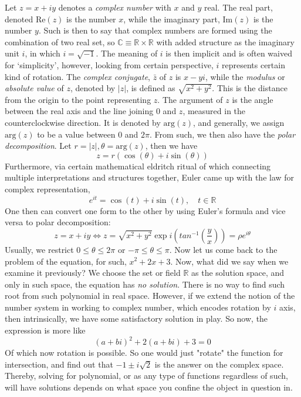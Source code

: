 Let $z=x+iy$ denotes a \textit{complex number} with $x$ and $y$ real. The real part, denoted $\mathrm{Re}{(z)}$ is the number $x$, while the imaginary part, $\mathrm{Im}{(z)}$ is the number $y$. Such is then to say that complex numbers are formed using the combination of two real set, so $\mathbb{C}\equiv \mathbb{R}\times\mathbb{R}$ with added structure as the imaginary unit $i$, in which $i=\sqrt{-1}$. The meaning of $i$ is then implicit and is often waived for `simplicity', however, looking from certain perspective, $i$ represents certain kind of rotation. The \textit{complex conjugate}, $\bar{z}$ of $z$ is $x-yi$, while the \textit{modulus} or \textit{absolute value} of $z$, denoted by $|z|$, is defined as $\sqrt{x^{2}+y^{2}}$. This is the distance from the origin to the point representing $z$. The argument of $z$ is the angle between the real axis and the line joining $0$ and $z$, measured in the counterclockwise direction. It is denoted by $\mathrm{arg}{(z)}$, and generally, we assign $\mathrm{arg}{(z)}$ to be a value between $0$ and $2\pi$. From such, we then also have the \textit{polar decomposition}. Let $r=|z|, \theta = \mathrm{arg}{(z)}$, then we have 
\begin{equation}
    z= r(\cos{(\theta)}+ i\sin{(\theta)})
\end{equation}
Furthermore, via certain mathematical eldritch ritual of which connecting multiple interpretations and structures together, Euler came up with the law for complex representation, 
\begin{equation}
    e^{it} = \cos{(t)} + i\sin{(t)}, \quad t\in \mathbb{R}
\end{equation}
One then can convert one form to the other by using Euler's formula and vice versa to polar decomposition:
\begin{equation}
    z= x+ iy \Leftrightarrow z = \sqrt{x^{2}+y^{2}} \exp{i\left(tan^{-1}{\left(\frac{y}{x}\right)}\right)} = \rho e^{i\theta}
\end{equation}
Usually, we restrict $0\leq \theta \leq 2\pi$ or $-\pi \leq \theta \leq \pi$. Now let us come back to the problem of the equation, for such, $x^{2}+2x+3$. Now, what did we say when we examine it previously? We choose the set or field $\mathbb{R}$ as the solution space, and only in such space, the equation has \textit{no solution}. There is no way to find such root from such polynomial in real space. However, if we extend the notion of the number system in working to complex number, which encodes rotation by $i$ axis, then intrinsically, we have some satisfactory solution in play. So now, the expression is more like 
\begin{equation}
    (a+bi)^{2} + 2(a+bi)+ 3 = 0
\end{equation}
Of which now rotation is possible. So one would just "rotate" the function for intersection, and find out that $-1 \pm i\sqrt{2}$ is the answer on the complex space. Thereby, solving for polynomial, or as any type of functions regardless of such, will have solutions depends on what space you confine the object in question in. 


